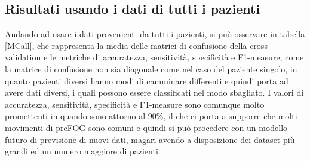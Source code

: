 \begin{table}[h]
	\centering
	\caption{Metriche di misura della predizione per il singolo paziente}
	\label{Mpred}
\end{table}

\subsection{Risultati usando i dati di tutti i pazienti}
Andando ad usare i dati provenienti da tutti i pazienti, si può osservare in tabella \ref{MCall}, che rappresenta la media delle matrici di confusione della cross-validation e le metriche di accuratezza, sensitività, specificità e F1-measure, come la matrice di confusione non sia diagonale come nel caso del paziente singolo, in quanto pazienti diversi hanno modi di camminare differenti e quindi porta ad avere dati diversi, i quali possono essere classificati nel modo sbagliato. I valori di accuratezza, sensitività, specificità e F1-measure sono comunque molto promettenti in quando sono attorno al 90\%, il che ci porta a supporre che molti movimenti di preFOG sono comuni e quindi si può procedere con un modello futuro di previsione di nuovi dati, magari avendo a disposizione dei dataset più grandi ed un numero maggiore di pazienti.

